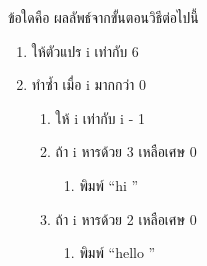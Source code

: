 ﻿%
\question ข้อใดคือ ผลลัพธ์จากขั้นตอนวิธีต่อไปนี้
\begin{pseudocode}
\begin{enumerate}
    \item ให้ตัวแปร i เท่ากับ 6
    \item ทำซ้ำ เมื่อ i มากกว่า 0
    \begin{enumerate}
        \item ให้ i เท่ากับ i - 1
        \item ถ้า i หารด้วย 3 เหลือเศษ 0
        \begin{enumerate}
            \item พิมพ์ “hi ” 
        \end{enumerate}
        \item ถ้า i หารด้วย 2 เหลือเศษ 0
        \begin{enumerate}
            \item พิมพ์ “hello ” 
        \end{enumerate}
    \end{enumerate}
\end{enumerate}
\end{pseudocode}

